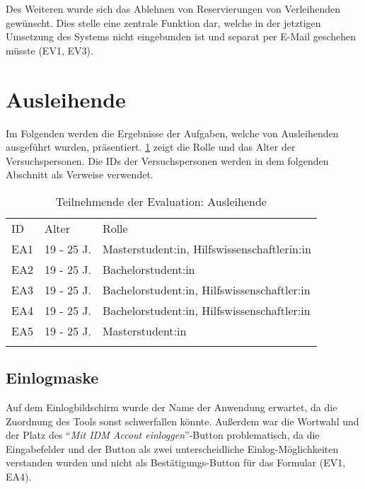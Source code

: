 Des Weiteren wurde sich das Ablehnen von Reservierungen von Verleihenden gewünscht. Dies stelle
eine zentrale Funktion dar, welche in der jetztigen Umsetzung des Systems nicht eingebunden ist und
separat per E-Mail geschehen müsste (EV1, EV3).

\section{Ausleihende}
Im Folgenden werden die Ergebnisse der Aufgaben, welche von Ausleihenden ausgeführt wurden,
präsentiert. \ref{table:azwei} zeigt die Rolle und das Alter der Versuchspersonen. Die IDs der
Versuchspersonen werden in dem folgenden Abschnitt als Verweise verwendet.

\begin{table}[h]
        \centering
        \caption{Teilnehmende der Evaluation: Ausleihende}
        \begin{tabular}{lll}
                \arrayrulecolor{maincolor}\hline
                \sffamily\color{maincolor}ID & \sffamily\color{maincolor}Alter &
                \sffamily\color{maincolor}Rolle                                  \\
                \arrayrulecolor{maincolor}\hline
                EA1                          & 19 - 25 J.                      &
                Masterstudent:in, Hilfswissenschaftlerin:in                      \\
                EA2                          & 19 - 25 J.                      &
                Bachelorstudent:in                                               \\
                EA3                          & 19 - 25 J.                      &
                Bachelorstudent:in, Hilfswissenschaftler:in                      \\
                EA4                          & 19 - 25 J.                      &
                Bachelorstudent:in, Hilfswissenschaftler:in                      \\
                EA5                          & 19 - 25 J.                      &
                Masterstudent:in                                                 \\
                \arrayrulecolor{maincolor}\hline
        \end{tabular}
        \label{table:azwei}
\end{table}

\subsection{Einlogmaske}
Auf dem Einlogbildschirm wurde der Name der Anwendung erwartet, da die
Zuordnung des Tools sonst schwerfallen könnte. Außerdem war die Wortwahl und der
Platz des \enquote{\textit{Mit IDM Accout einloggen}}-Button problematisch, da die
Eingabefelder und der Button als zwei unterscheidliche Einlog-Möglichkeiten verstanden
wurden und nicht als Bestätigungs-Button für das Formular (EV1, EA4).

